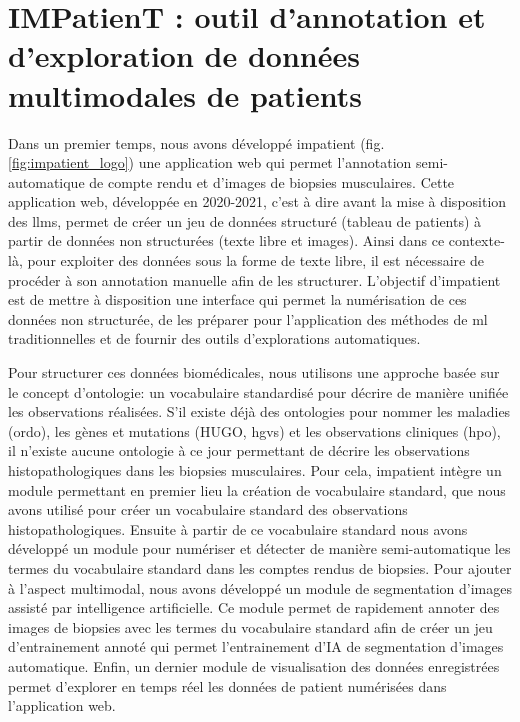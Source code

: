 \chapter{IMPatienT : outil d’annotation et d’exploration de données multimodales de patients}

Dans un premier temps, nous avons développé \gls{impatient} (fig. \ref{fig:impatient_logo}) une application web qui permet l'annotation semi-automatique de compte rendu et d'images de biopsies musculaires. Cette application web, développée en 2020-2021, c'est à dire avant la mise à disposition des \gls{llms}, permet de créer un jeu de données structuré (tableau de patients) à partir de données non structurées (texte libre et images). Ainsi dans ce contexte-là, pour exploiter des données sous la forme de texte libre, il est nécessaire de procéder à son annotation manuelle afin de les structurer. L'objectif d'\gls{impatient} est de mettre à disposition une interface qui permet la numérisation de ces données non structurée, de les préparer pour l'application des méthodes de \gls{ml} traditionnelles et de fournir des outils d'explorations automatiques.


Pour structurer ces données biomédicales, nous utilisons une approche basée sur le concept d'ontologie: un vocabulaire standardisé pour décrire de manière unifiée les observations réalisées. S'il existe déjà des ontologies pour nommer les maladies (\gls{ordo}), les gènes et mutations (HUGO, \gls{hgvs}) et les observations cliniques (\gls{hpo}), il n'existe aucune ontologie à ce jour permettant de décrire les observations histopathologiques dans les biopsies musculaires. Pour cela, \gls{impatient} intègre un module permettant en premier lieu la création de vocabulaire standard, que nous avons utilisé pour créer un vocabulaire standard des observations histopathologiques. Ensuite à partir de ce vocabulaire standard nous avons développé un module pour numériser et détecter de manière semi-automatique les termes du vocabulaire standard dans les comptes rendus de biopsies. Pour ajouter à l'aspect multimodal, nous avons développé un module de segmentation d'images assisté par intelligence artificielle. Ce module permet de rapidement annoter des images de biopsies avec les  termes du vocabulaire standard afin de créer un jeu d'entrainement annoté qui permet l'entrainement d'IA de segmentation d'images automatique. Enfin, un dernier module de visualisation des données enregistrées permet d'explorer en temps réel les données de patient numérisées dans l'application web.

